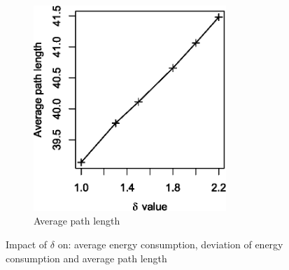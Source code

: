 \begin{figure}[!htb]
\begin{subfigure}{0.5\textwidth}
\end{subfigure}
\begin{subfigure}{0.5\textwidth}
  \centering
  \includegraphics[width=0.8\textwidth]{Chapter7/Chapter7Figs/nhr-path-plot.eps}
  \caption{Average path length}
\end{subfigure}
\caption{Impact of $\delta$ on: average energy consumption, deviation of energy consumption and average path length}
\end{figure}
